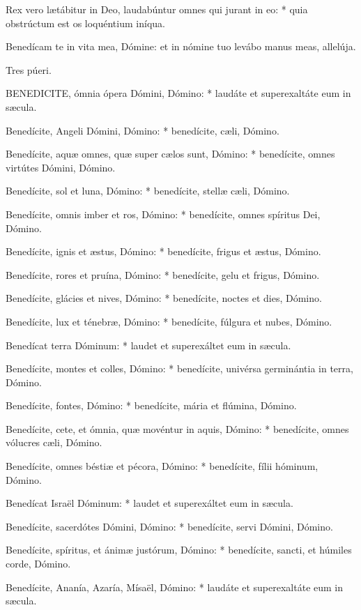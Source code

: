 Rex vero lætábitur in Deo, laudabúntur omnes qui jurant in eo: * quia obstrúctum est os loquéntium iníqua.

 Benedícam te in vita mea, Dómine: et in nómine tuo levábo manus meas, allelúja.

 Tres púeri.


\lettrine[lines=2]{B}{ENEDICITE}, ómnia ópera Dómini, Dómino: * laudáte et superexaltáte eum in sæcula.

Benedícite, Angeli Dómini, Dómino: * benedícite, cæli, Dómino.

Benedícite, aquæ omnes, quæ super cælos sunt, Dómino: * benedícite, omnes virtútes Dómini, Dómino.

Benedícite, sol et luna, Dómino: * benedícite, stellæ cæli, Dómino.

Benedícite, omnis imber et ros, Dómino: * benedícite, omnes spíritus Dei, Dómino.

Benedícite, ignis et æstus, Dómino: * benedícite, frigus et æstus, Dómino.

Benedícite, rores et pruína, Dómino: * benedícite, gelu et frigus, Dómino.

Benedícite, glácies et nives, Dómino: * benedícite, noctes et dies, Dómino.

Benedícite, lux et ténebræ, Dómino: * benedícite, fúlgura et nubes, Dómino.

Benedícat terra Dóminum: * laudet et superexáltet eum in sæcula.

Benedícite, montes et colles, Dómino: * benedícite, univérsa germinántia in terra, Dómino.

Benedícite, fontes, Dómino: * benedícite, mária et flúmina, Dómino.

Benedícite, cete, et ómnia, quæ movéntur in aquis, Dómino: * benedícite, omnes vólucres cæli, Dómino.

Benedícite, omnes béstiæ et pécora, Dómino: * benedícite, fílii hóminum, Dómino.

Benedícat Israël Dóminum: * laudet et superexáltet eum in sæcula.

Benedícite, sacerdótes Dómini, Dómino: * benedícite, servi Dómini, Dómino.

Benedícite, spíritus, et ánimæ justórum, Dómino: * benedícite, sancti, et húmiles corde, Dómino.

Benedícite, Ananía, Azaría, Mísaël, Dómino: * laudáte et superexaltáte eum in sæcula.

